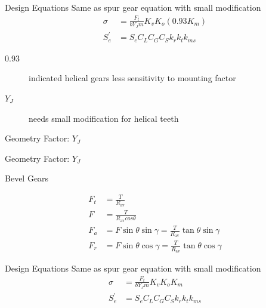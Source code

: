 \documentclass[
10pt,
a4paper,
openany,
svgnames,
]{book}
\begin{document}
\begin{frame}{Design Equations}
  Same as spur gear equation with small modification
  \begin{align*}
    \sigma &= \frac{F_{t}}{bY_{J}m} K_{v} K_{o} (0.93 K_{m}) \\
    S_{e}^{\prime} &= S_{e}C_{L}C_{G}C_{S}k_{r}k_{t}k_{ms}
  \end{align*}
  \begin{description}
    \item[0.93] indicated helical gears less sensitivity to mounting factor
    \item[$Y_{J}$] needs small modification for helical teeth
  \end{description}
\end{frame}

\begin{frame}{Geometry Factor: $Y_{J}$}
  \begin{figure}[htbp]
    \centering
  \end{figure}
\end{frame}

\begin{frame}{Geometry Factor: $Y_{J}$}
  \begin{figure}[htbp]
    \centering
  \end{figure}
\end{frame}

\begin{frame}{Bevel Gears}
      \begin{figure}[htbp]
        \centering
      \end{figure}
      \begin{align*}
        F_{t} &= \frac{T}{R_{\text{av}}} \\
        F &= \frac{T}{R_{\text{av}} cos \theta} \\
        F_{a} &= F \sin \theta \sin \gamma = \frac{T}{R_{\text{av}}} \tan \theta \sin \gamma \\
        F_{r} &= F \sin \theta \cos \gamma = \frac{T}{R_{\text{av}}} \tan \theta \cos \gamma
      \end{align*}
\end{frame}

\begin{frame}{Design Equations}
  Same as spur gear equation with small modification
  \begin{align*}
    \sigma &= \frac{F_{t}}{bY_{J}m} K_{v} K_{o} K_{m} \\
    S_{e}^{\prime} &= S_{e}C_{L}C_{G}C_{S}k_{r}k_{t}k_{ms}
  \end{align*}
\end{frame}
\end{document}

